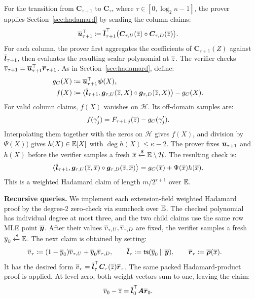 For the transition from \(\bm C_{\tau+1}\) to \(\bm C_\tau\),
where \(\tau \in [0,\log_2\kappa-1]\), the prover applies
Section~\ref{sec:hadamard} by sending the column claims:
\[
    \overline{\bm u}_{\tau+1}^{\top}
       \coloneqq
    \overline{\bm l}_{\tau+1}^{\top}
        \bigl(\bm C_{\tau,U}(\overline{z})
               \circ\bm C_{\tau,D}(\overline{z})\bigr).
\]
For each column, the prover first aggregates the coefficients
of \(\bm C_{\tau+1}(Z)\) against \(\overline{\bm l}_{\tau+1}\),
then evaluates the resulting scalar polynomial at \(\overline{z}\).
The verifier checks
\(\overline{v}_{\tau+1}=\overline{\bm u}_{\tau+1}^{\top}
\overline{\bm r}_{\tau+1}\).
As in Section~\ref{sec:hadamard}, define:
\[
\begin{aligned}
    g_C(X)&\coloneqq\overline{\bm u}_{\tau+1}^{\top}\bm\psi(X),\\
    f(X)&\coloneqq
       \left\langle\overline{\bm l}_{\tau+1},
          \bm g_{\tau,U}(\overline{z},X)
             \circ\bm g_{\tau,D}(\overline{z},X)\right\rangle
       -g_C(X).
\end{aligned}
\]
For valid column claims, \(f(X)\) vanishes on \(\mathcal H\).
Its off-domain samples are:
\[
    f(\gamma'_j)
       =F_{\tau+1,j}(\overline{z})-g_C(\gamma'_j).
\]
Interpolating them together with the zeros on \(\mathcal H\)
gives \(f(X)\), and division by \(\Psi(X)\)) gives
\(h(X)\in\mathbb{E}[X]\) with \(\deg h (X)\leq\kappa-2\).
The prover fixes \(\overline{\bm u}_{\tau+1}\) and \(h(X)\) before the
verifier samples a fresh
\(\overline{x}\mathrel{\xleftarrow{\$}}\mathbb{E}\setminus\mathcal H\).
The resulting check is:
\[
    \left\langle\overline{\bm l}_{\tau+1},
       \bm g_{\tau,U}(\overline{z},\overline{x})
         \circ\bm g_{\tau,D}(\overline{z},\overline{x})\right\rangle
       =g_C(\overline{x})+\Psi(\overline{x})h(\overline{x}).
\]
This is a weighted Hadamard claim of length \(m/2^{\tau+1}\)
over \(\mathbb{E}\).

\smallskip\noindent\textbf{Recursive queries.}
We implement each extension-field weighted Hadamard proof by the degree-2 zero-check via
sumcheck over $\mathbb{E}$. The checked polynomial has individual degree at most
three, and the two child claims use the same row MLE point
\(\overline{\bm y}\).
After their values \(\overline{v}_{\tau,U},\overline{v}_{\tau,D}\) are fixed,
the verifier samples a fresh \(\overline{y}_0\mathrel{\xleftarrow{\$}}\mathbb{E}\).
The next claim is obtained by setting:
\[
\begin{aligned}
    \overline{v}_\tau
      &\coloneqq(1-\overline{y}_0)\overline{v}_{\tau,U}
                    +\overline{y}_0\overline{v}_{\tau,D},
                    \qquad
    \overline{\bm l}_\tau
      \coloneqq{\sf ts}(\overline{y}_0\mathbin\|\overline{\bm y}),
    \qquad
    \overline{\bm r}_\tau
      \coloneqq\overline{\bm\rho}(\overline{x}).
\end{aligned}
\]
It has the desired form
\(\overline{v}_\tau=\overline{\bm l}_\tau^\top
\bm C_\tau(\overline{z})\overline{\bm r}_\tau\).
The same packed Hadamard-product proof is applied.
At level zero, both weight vectors sum to one, leaving the
claim:
\[
    \overline{v}_0-\overline{z}
       =\overline{\bm l}_0^\top\bm A\overline{\bm r}_0.
\]

